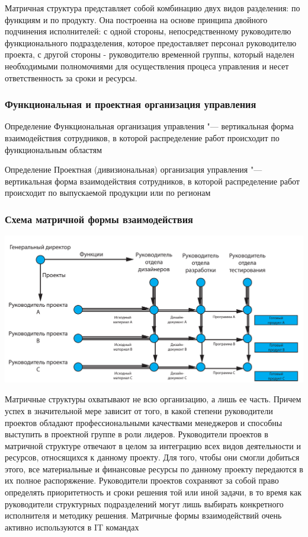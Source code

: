\documentclass{../industrial-development}
\begin{document}
\lecturenotes
Матричная структура представляет собой комбинацию двух видов разделения: по функциям и по продукту. Она построенна на основе принципа двойного подчинения исполнителей: с одной стороны, непосредственному руководителю функционального подразделения, которое предоставляет персонал руководителю проекта, с другой стороны  - руководителю временной группы, который наделен необходимыми полномочиями для осуществления процеса управления и несет ответственность за сроки и ресурсы.

\begin{frame} \frametitle{Функциональная и проектная организация управления}
	\begin{block}{Определение}
		\alert{Функциональная организация управления} "--- вертикальная форма взаимодействия сотрудников, в которой распределение работ происходит по функциональным областям
	\end{block}
	\begin{block}{Определение}
		\alert{Проектная (дивизиональная) организация управления} "--- вертикальная форма взаимодействия сотрудников, в которой распределение работ происходит по выпускаемой продукции или по регионам
	\end{block}
\end{frame}

\begin{frame} \frametitle{Схема матричной формы взаимодействия}

\begin{block}{}
	\centerline{\includegraphics[width=1\textwidth]{matrix.pdf}}
\end{block}

\end{frame}

\lecturenotes
Матричные структуры охватывают не всю организацию, а лишь ее часть. Причем успех в значительной мере зависит от того, в какой степени руководители проектов обладают профессиональными качествами менеджеров и способны выступить в проектной группе в роли лидеров.
Руководители проектов в матричной структуре отвечают в целом за интеграцию всех видов деятельности и ресурсов, относящихся к данному проекту. Для того, чтобы они смогли добиться этого, все материальные и финансовые ресурсы по данному проекту передаются в их полное распоряжение. Руководители проектов сохраняют за собой право определять приоритетность и сроки решения той или иной задачи, в то время как руководители структурных подразделений могут лишь выбирать конкретного исполнителя и методику решения.
Матричные формы взаимодействий очень активно используются в IT  командах
\end{document}
